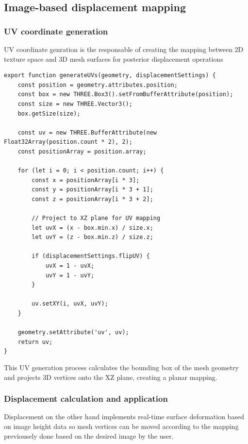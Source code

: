 \subsection{Image-based displacement mapping}

\subsubsection{UV coordinate generation}

UV coordinate genration is the responsable of creating the mapping between 2D texture space and 3D mesh surfaces for posterior displacement operations

\begin{verbatim}
export function generateUVs(geometry, displacementSettings) {
    const position = geometry.attributes.position;
    const box = new THREE.Box3().setFromBufferAttribute(position);
    const size = new THREE.Vector3();
    box.getSize(size);

    const uv = new THREE.BufferAttribute(new Float32Array(position.count * 2), 2);
    const positionArray = position.array;

    for (let i = 0; i < position.count; i++) {
        const x = positionArray[i * 3];
        const y = positionArray[i * 3 + 1];
        const z = positionArray[i * 3 + 2];
        
        // Project to XZ plane for UV mapping
        let uvX = (x - box.min.x) / size.x;
        let uvY = (z - box.min.z) / size.z;
        
        if (displacementSettings.flipUV) {
            uvX = 1 - uvX;
            uvY = 1 - uvY;
        }
        
        uv.setXY(i, uvX, uvY);
    }

    geometry.setAttribute('uv', uv);
    return uv;
}
\end{verbatim}

This UV generation process calculates the bounding box of the mesh geometry and projects 3D vertices onto the XZ plane, creating a planar mapping.

\subsubsection{Displacement calculation and application}

Displacement on the other hand implements real-time surface deformation based on image height data so mesh vertices can be moved according to the mapping previousely done based on the desired image by the user.

